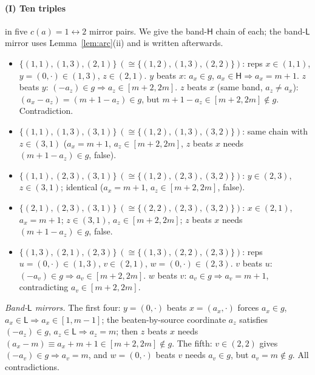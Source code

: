\documentclass[11pt]{article}
\newcommand{\Hi}{\mathsf{H}}
\newcommand{\Lo}{\mathsf{L}}
\theoremstyle{plain}
\theoremstyle{definition}
\begin{document}
\paragraph{(I) Ten triples} in five $c(a){=}1\leftrightarrow2$ mirror pairs. We give the band-$\Hi$
chain of each; the band-$\Lo$ mirror uses Lemma~\ref{lem:arc}(ii) and is written afterwards.
\begin{itemize}
\item $\{(1,1),(1,3),(2,1)\}\ (\cong\{(1,2),(1,3),(2,2)\})$: reps $x\in(1,1)$, $y=(0,\cdot)\in(1,3)$,
$z\in(2,1)$. $y$ beats $x$: $a_x\in g$, $a_x\in\Hi\Rightarrow a_x=m+1$. $z$ beats $y$: $(-a_z)\in g
\Rightarrow a_z\in[m+2,2m]$. $z$ beats $x$ (same band, $a_z\ne a_x$): $(a_x-a_z)=(m+1-a_z)\in g$,
but $m+1-a_z\in[m+2,2m]\notin g$. Contradiction.
\item $\{(1,1),(1,3),(3,1)\}\ (\cong\{(1,2),(1,3),(3,2)\})$: same chain with $z\in(3,1)$
($a_x=m+1$, $a_z\in[m+2,2m]$, $z$ beats $x$ needs $(m+1-a_z)\in g$, false).
\item $\{(1,1),(2,3),(3,1)\}\ (\cong\{(1,2),(2,3),(3,2)\})$: $y\in(2,3)$, $z\in(3,1)$; identical
($a_x=m+1$, $a_z\in[m+2,2m]$, false).
\item $\{(2,1),(2,3),(3,1)\}\ (\cong\{(2,2),(2,3),(3,2)\})$: $x\in(2,1)$, $a_x=m+1$; $z\in(3,1)$,
$a_z\in[m+2,2m]$; $z$ beats $x$ needs $(m+1-a_z)\in g$, false.
\item $\{(1,3),(2,1),(2,3)\}\ (\cong\{(1,3),(2,2),(2,3)\})$: reps $u=(0,\cdot)\in(1,3)$, $v\in(2,1)$,
$w=(0,\cdot)\in(2,3)$. $v$ beats $u$: $(-a_v)\in g\Rightarrow a_v\in[m+2,2m]$. $w$ beats $v$:
$a_v\in g\Rightarrow a_v=m+1$, contradicting $a_v\in[m+2,2m]$.
\end{itemize}
\emph{Band-$\Lo$ mirrors.} The first four: $y=(0,\cdot)$ beats $x=(a_x,\cdot)$ forces $a_x\in g$,
$a_x\in\Lo\Rightarrow a_x\in[1,m-1]$; the beaten-by-source coordinate $a_z$ satisfies $(-a_z)\in g$,
$a_z\in\Lo\Rightarrow a_z=m$; then $z$ beats $x$ needs $(a_x-m)\equiv a_x+m+1\in[m+2,2m]\notin g$.
The fifth: $v\in(2,2)$ gives $(-a_v)\in g\Rightarrow a_v=m$, and $w=(0,\cdot)$ beats $v$ needs
$a_v\in g$, but $a_v=m\notin g$. All contradictions.
\end{document}
